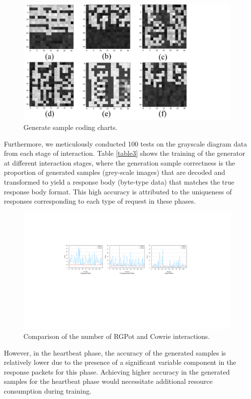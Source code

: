 \documentclass[journal]{IEEEtai}
\begin{document}
\begin{figure}[!h]
	\centering
	\includegraphics[width = 0.7\linewidth]{Figures/Fake_Data.pdf}
	\caption{Generate sample coding charts.}
	\label{Fake_Data}
\end{figure}

Furthermore, we meticulously conducted 100 tests on the grayscale diagram data from each stage of interaction. 
Table \ref{table3} shows the training of the generator at different interaction stages, where the generation sample correctness is the proportion of generated samples (grey-scale images) that are decoded and transformed to yield a response body (byte-type data) that matches the true response body format.
This high accuracy is attributed to the uniqueness of responses corresponding to each type of request in these phases.

\begin{figure}[!h]
	\centering
	\includegraphics[width = \linewidth]{Figures/Interaction testing at all stages.pdf}
	\caption{Comparison of the number of RGPot and Cowrie interactions.}
	\label{Comparison_of_Interaction_Capabilities}
\end{figure}

However, in the heartbeat phase, the accuracy of the generated samples is relatively lower due to the presence of a significant variable component in the response packets for this phase. 
Achieving higher accuracy in the generated samples for the heartbeat phase would necessitate additional resource consumption during training.
\end{document}
